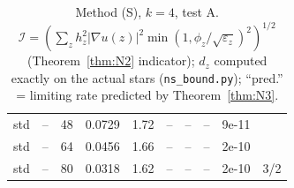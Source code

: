 \begin{table}[ht]
\begin{tabular}{llrrrrrrrl}
std & -- & 48 & 0.0729 & 1.72 & -- & -- & -- & 9e-11 & \\
std & -- & 64 & 0.0456 & 1.66 & -- & -- & -- & 2e-10 & \\
std & -- & 80 & 0.0318 & 1.62 & -- & -- & -- & 2e-10 & 3/2\\
\bottomrule\end{tabular}
\caption{Method (S), $k=4$, test A. $\mathcal I=(\sum_{z}h_z^2|\nabla u(z)|^2\min(1,\phi_z/\sqrt{\varepsilon_z})^2)^{1/2}$ (Theorem~\ref{thm:N2} indicator);
$d_z$ computed exactly on the actual stars (\texttt{ns\_bound.py}); ``pred.'' = limiting rate predicted by Theorem~\ref{thm:N3}.}\label{tab:fe}
\end{table}
